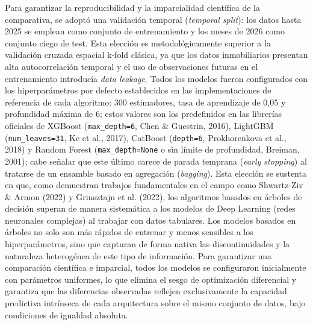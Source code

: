 \documentclass[a4paper,11pt,openany]{book}
\begin{document}
Para garantizar la reproducibilidad y la imparcialidad científica de la comparativa, se adoptó una validación temporal (\textit{temporal split}): los datos hasta 2025 se emplean como conjunto de entrenamiento y los meses de 2026 como conjunto ciego de test. Esta elección es metodológicamente superior a la validación cruzada espacial k-fold clásica, ya que los datos inmobiliarios presentan alta autocorrelación temporal y el uso de observaciones futuras en el entrenamiento introducía \textit{data leakage}. Todos los modelos fueron configurados con los hiperparámetros por defecto establecidos en las implementaciones de referencia de cada algoritmo: 300 estimadores, tasa de aprendizaje de 0,05 y profundidad máxima de 6; estos valores son los predefinidos en las librerías oficiales de XGBoost (\texttt{max\_depth=6}, Chen \& Guestrin, 2016), LightGBM (\texttt{num\_leaves=31}, Ke et al., 2017), CatBoost (\texttt{depth=6}, Prokhorenkova et al., 2018) y Random Forest (\texttt{max\_depth=None} o sin límite de profundidad, Breiman, 2001); cabe señalar que este último carece de parada temprana (\textit{early stopping}) al tratarse de un ensamble basado en agregación (\textit{bagging}). Esta elección se sustenta en que, como demuestran trabajos fundamentales en el campo como Shwartz-Ziv \& Armon (2022) y Grinsztajn et al. (2022), los algoritmos basados en árboles de decisión superan de manera sistemática a los modelos de Deep Learning (redes neuronales complejas) al trabajar con datos tabulares. Los modelos basados en árboles no solo son más rápidos de entrenar y menos sensibles a los hiperparámetros, sino que capturan de forma nativa las discontinuidades y la naturaleza heterogénea de este tipo de información. Para garantizar una comparación científica e imparcial, todos los modelos se configuraron inicialmente con parámetros uniformes, lo que elimina el sesgo de optimización diferencial y garantiza que las diferencias observadas reflejen exclusivamente la capacidad predictiva intrínseca de cada arquitectura sobre el mismo conjunto de datos, bajo condiciones de igualdad absoluta.
\end{document}
